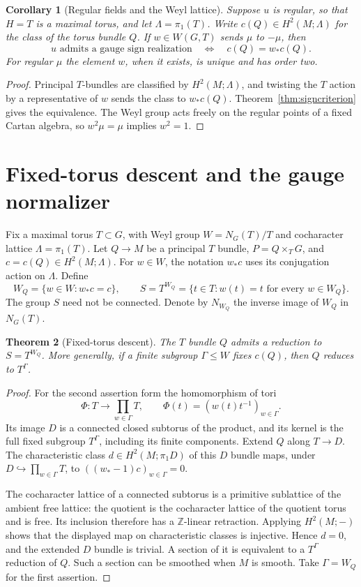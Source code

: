 \documentclass[11pt]{amsart}
\newcommand{\Z}{\mathbb Z}
\theoremstyle{plain}
\newtheorem{theorem}{Theorem}[section]
\newtheorem{corollary}[theorem]{Corollary}
\theoremstyle{definition}
\theoremstyle{remark}
\begin{document}
\begin{corollary}[Regular fields and the Weyl lattice]\label{cor:weyllattice}
Suppose $u$ is regular, so that $H=T$ is a maximal torus, and let $\Lambda=\pi_1(T)$.  Write $c(Q)\in H^2(M;\Lambda)$ for the class of the torus bundle $Q$.  If $w\in W(G,T)$ sends $\mu$ to $-\mu$, then
\[
 u\text{ admits a gauge sign realization}
 \quad\Longleftrightarrow\quad c(Q)=w_*c(Q).
\]
For regular $\mu$ the element $w$, when it exists, is unique and has order two.
\end{corollary}

\begin{proof}
Principal $T$-bundles are classified by $H^2(M;\Lambda)$, and twisting the $T$ action by a representative of $w$ sends the class to $w_*c(Q)$.  Theorem~\ref{thm:signcriterion} gives the equivalence.  The Weyl group acts freely on the regular points of a fixed Cartan algebra, so $w^2\mu=\mu$ implies $w^2=1$.
\end{proof}

\section{Fixed-torus descent and the gauge normalizer}

Fix a maximal torus $T\subset G$, with Weyl group $W=N_G(T)/T$ and cocharacter lattice $\Lambda=\pi_1(T)$. Let $Q\to M$ be a principal $T$ bundle, $P=Q\times_TG$, and $c=c(Q)\in H^2(M;\Lambda)$. For $w\in W$, the notation $w_*c$ uses its conjugation action on $\Lambda$. Define
\[
 W_Q=\{w\in W:w_*c=c\},\qquad
 S=T^{W_Q}=\{t\in T:w(t)=t\text{ for every }w\in W_Q\}.
\]
The group $S$ need not be connected. Denote by $N_{W_Q}$ the inverse image of $W_Q$ in $N_G(T)$.

\begin{theorem}[Fixed-torus descent]\label{thm:descent}
The $T$ bundle $Q$ admits a reduction to $S=T^{W_Q}$. More generally, if a finite subgroup $\Gamma\leq W$ fixes $c(Q)$, then $Q$ reduces to $T^\Gamma$.
\end{theorem}

\begin{proof}
For the second assertion form the homomorphism of tori
\[
 \Phi:T\longrightarrow\prod_{w\in\Gamma}T,
 \qquad \Phi(t)=(w(t)t^{-1})_{w\in\Gamma}.
\]
Its image $D$ is a connected closed subtorus of the product, and its kernel is the full fixed subgroup $T^\Gamma$, including its finite components. Extend $Q$ along $T\to D$. The characteristic class $d\in H^2(M;\pi_1D)$ of this $D$ bundle maps, under $D\hookrightarrow\prod_{w\in\Gamma}T$, to $((w_*-1)c)_{w\in\Gamma}=0$.

The cocharacter lattice of a connected subtorus is a primitive sublattice of the ambient free lattice: the quotient is the cocharacter lattice of the quotient torus and is free. Its inclusion therefore has a $\Z$-linear retraction. Applying $H^2(M;-)$ shows that the displayed map on characteristic classes is injective. Hence $d=0$, and the extended $D$ bundle is trivial. A section of it is equivalent to a $T^\Gamma$ reduction of $Q$. Such a section can be smoothed when $M$ is smooth. Take $\Gamma=W_Q$ for the first assertion.
\end{proof}
\end{document}

